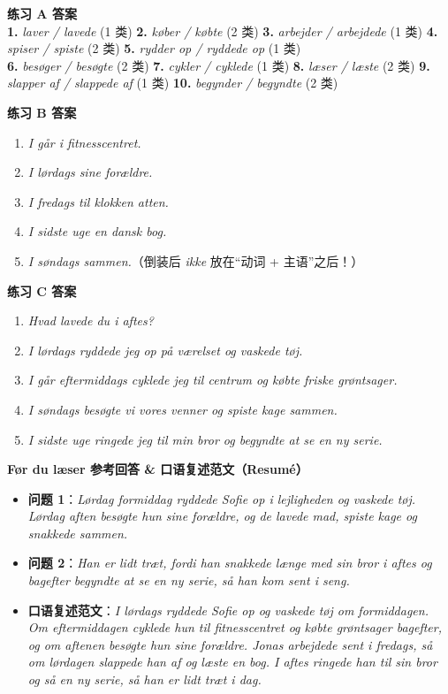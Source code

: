\begin{answerbox}
\textbf{练习 A 答案}\\
\textbf{1.} \textit{laver / lavede} (1 类) \quad \textbf{2.} \textit{køber / købte} (2 类) \quad \textbf{3.} \textit{arbejder / arbejdede} (1 类) \quad \textbf{4.} \textit{spiser / spiste} (2 类) \quad \textbf{5.} \textit{rydder op / ryddede op} (1 类)\\
\textbf{6.} \textit{besøger / besøgte} (2 类) \quad \textbf{7.} \textit{cykler / cyklede} (1 类) \quad \textbf{8.} \textit{læser / læste} (2 类) \quad \textbf{9.} \textit{slapper af / slappede af} (1 类) \quad \textbf{10.} \textit{begynder / begyndte} (2 类)

\textbf{练习 B 答案}
\begin{enumerate}
  \item \textit{I går  i fitnesscentret.}
  \item \textit{I lørdags  sine forældre.}
  \item \textit{I fredags  til klokken atten.}
  \item \textit{I sidste uge  en dansk bog.}
  \item \textit{I søndags  sammen.}（倒装后 \textit{ikke} 放在“动词 + 主语”之后！）
\end{enumerate}

\textbf{练习 C 答案}
\begin{enumerate}
  \item \textit{Hvad lavede du i aftes?}
  \item \textit{I lørdags ryddede jeg op på værelset og vaskede tøj.}
  \item \textit{I går eftermiddags cyklede jeg til centrum og købte friske grøntsager.}
  \item \textit{I søndags besøgte vi vores venner og spiste kage sammen.}
  \item \textit{I sidste uge ringede jeg til min bror og begyndte at se en ny serie.}
\end{enumerate}

\textbf{Før du læser 参考回答 \& 口语复述范文（Resumé）}
\begin{itemize}
  \item \textbf{问题 1}：\textit{Lørdag formiddag ryddede Sofie op i lejligheden og vaskede tøj. Lørdag aften besøgte hun sine forældre, og de lavede mad, spiste kage og snakkede sammen.}
  \item \textbf{问题 2}：\textit{Han er lidt træt, fordi han snakkede længe med sin bror i aftes og bagefter begyndte at se en ny serie, så han kom sent i seng.}
  \item \textbf{口语复述范文}：\textit{I lørdags ryddede Sofie op og vaskede tøj om formiddagen. Om eftermiddagen cyklede hun til fitnesscentret og købte grøntsager bagefter, og om aftenen besøgte hun sine forældre. Jonas arbejdede sent i fredags, så om lørdagen slappede han af og læste en bog. I aftes ringede han til sin bror og så en ny serie, så han er lidt træt i dag.}
\end{itemize}
\end{answerbox}
